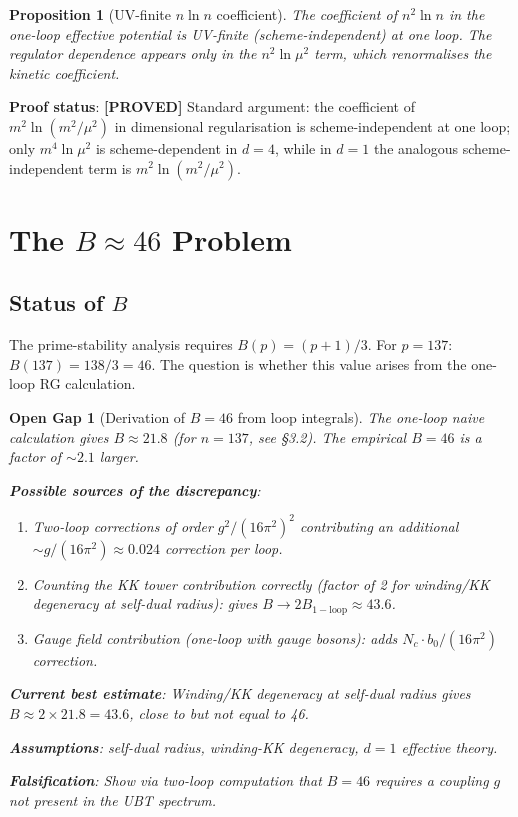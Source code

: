 \documentclass[11pt,a4paper]{article}
\newtheorem{proposition}{Proposition}
\newtheorem{gap}{Open Gap}
\newcommand{\proved}[1]{\textbf{[PROVED]} #1}
\begin{document}
\begin{proposition}[UV-finite $n\ln n$ coefficient]
  The coefficient of $n^2\ln n$ in the one-loop effective potential is
  UV-finite (scheme-independent) at one loop.  The regulator dependence
  appears only in the $n^2\ln\mu^2$ term, which renormalises the kinetic
  coefficient.
\end{proposition}

\textbf{Proof status}: \proved{Standard argument: the coefficient of
$m^2\ln(m^2/\mu^2)$ in dimensional regularisation is scheme-independent
at one loop; only $m^4\ln\mu^2$ is scheme-dependent in $d=4$, while in
$d=1$ the analogous scheme-independent term is $m^2\ln(m^2/\mu^2)$.}

\section{The \texorpdfstring{$B\approx 46$}{B~46} Problem}

\subsection{Status of $B$}

The prime-stability analysis requires $B(p) = (p+1)/3$.  For $p = 137$:
$B(137) = 138/3 = 46$.  The question is whether this value arises from the
one-loop RG calculation.

\begin{gap}[Derivation of $B = 46$ from loop integrals]
  \label{gap:B46}
  The one-loop naive calculation gives $B \approx 21.8$ (for $n = 137$, see §3.2).
  The empirical $B = 46$ is a factor of $\sim 2.1$ larger.

  \textbf{Possible sources of the discrepancy}:
  \begin{enumerate}
    \item Two-loop corrections of order $g^2/(16\pi^2)^2$ contributing an
          additional $\sim g/(16\pi^2) \approx 0.024$ correction per loop.
    \item Counting the KK tower contribution correctly (factor of 2 for
          winding/KK degeneracy at self-dual radius): gives $B \to 2B_\mathrm{1-loop}
          \approx 43.6$.
    \item Gauge field contribution (one-loop with gauge bosons): adds
          $N_c \cdot b_0/(16\pi^2)$ correction.
  \end{enumerate}

  \textbf{Current best estimate}: Winding/KK degeneracy at self-dual radius
  gives $B \approx 2 \times 21.8 = 43.6$, close to but not equal to 46.

  \textbf{Assumptions}: self-dual radius, winding-KK degeneracy, $d=1$
  effective theory.

  \textbf{Falsification}: Show via two-loop computation that $B = 46$ requires
  a coupling $g$ not present in the UBT spectrum.
\end{gap}
\end{document}
